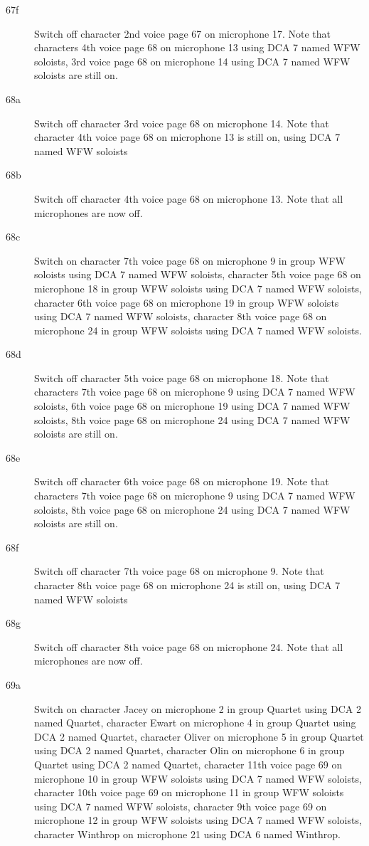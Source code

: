 \begin{description}
\item[67f]
Switch off character 2nd voice page 67 on microphone 17. Note that characters 4th voice page 68 on microphone 13 using DCA 7 named WFW soloists, 3rd voice page 68 on microphone 14 using DCA 7 named WFW soloists are still on.  

\item[68a]
Switch off character 3rd voice page 68 on microphone 14. Note that character 4th voice page 68 on microphone 13 is still on, using DCA 7 named WFW soloists

\item[68b]
Switch off character 4th voice page 68 on microphone 13. Note that all microphones are now off.

\item[68c]
Switch on character 7th voice page 68 on microphone 9 in group WFW soloists using DCA 7 named WFW soloists, character 5th voice page 68 on microphone 18 in group WFW soloists using DCA 7 named WFW soloists, character 6th voice page 68 on microphone 19 in group WFW soloists using DCA 7 named WFW soloists, character 8th voice page 68 on microphone 24 in group WFW soloists using DCA 7 named WFW soloists. 

\item[68d]
Switch off character 5th voice page 68 on microphone 18. Note that characters 7th voice page 68 on microphone 9 using DCA 7 named WFW soloists, 6th voice page 68 on microphone 19 using DCA 7 named WFW soloists, 8th voice page 68 on microphone 24 using DCA 7 named WFW soloists are still on.  

\item[68e]
Switch off character 6th voice page 68 on microphone 19. Note that characters 7th voice page 68 on microphone 9 using DCA 7 named WFW soloists, 8th voice page 68 on microphone 24 using DCA 7 named WFW soloists are still on.  

\item[68f]
Switch off character 7th voice page 68 on microphone 9. Note that character 8th voice page 68 on microphone 24 is still on, using DCA 7 named WFW soloists

\item[68g]
Switch off character 8th voice page 68 on microphone 24. Note that all microphones are now off.

\item[69a]
Switch on character Jacey on microphone 2 in group Quartet using DCA 2 named Quartet, character Ewart on microphone 4 in group Quartet using DCA 2 named Quartet, character Oliver on microphone 5 in group Quartet using DCA 2 named Quartet, character Olin on microphone 6 in group Quartet using DCA 2 named Quartet, character 11th voice page 69 on microphone 10 in group WFW soloists using DCA 7 named WFW soloists, character 10th voice page 69 on microphone 11 in group WFW soloists using DCA 7 named WFW soloists, character 9th voice page 69 on microphone 12 in group WFW soloists using DCA 7 named WFW soloists, character Winthrop on microphone 21 using DCA 6 named Winthrop. 


\end{description}
